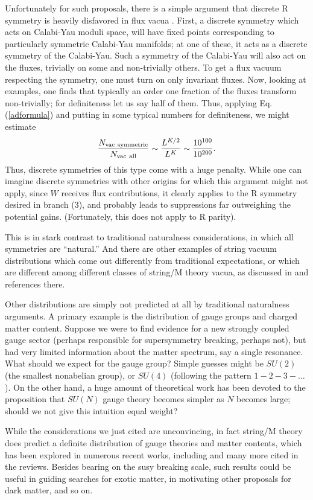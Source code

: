 \documentclass[aps,amsfonts]{ar2e}
\begin{document}
Unfortunately for such proposals, there
is a simple argument that discrete R symmetry
is heavily disfavored in flux vacua
\cite{Dine:2005gz}.
First, a discrete symmetry which acts on Calabi-Yau moduli space,
will have fixed points corresponding to particularly symmetric
Calabi-Yau manifolds; at one of these, it acts as a discrete
symmetry of the Calabi-Yau.  Such a symmetry of the Calabi-Yau will
also act on the fluxes, trivially on some and non-trivially others.
To get a flux vacuum respecting the symmetry, one must turn on only
invariant fluxes.  Now, looking at examples, one finds that
typically an order one fraction of the fluxes transform
non-trivially; for definiteness let us say half of them. Thus,
applying Eq. (\ref{adformula}) and putting in some typical numbers for
definiteness, we might estimate
$$
\frac{N_{\rm vac~symmetric}}{N_{\rm vac~all}} \sim
 \frac{L^{K/2}}{L^{K}} \sim \frac{10^{100}}{10^{200}} .
$$
Thus, discrete symmetries of this type come with a huge penalty.
While one can imagine discrete symmetries with other origins for
which this argument might not apply, since $W$ receives flux
contributions, it clearly applies to the R symmetry desired in
branch (3), and probably leads to suppressions far outweighing the
potential gains.  (Fortunately, this does not apply to R parity).

This is in stark contrast to traditional naturalness considerations,
in which all symmetries are ``natural.''  And there are other
examples of string vacuum distributions which come out differently
from traditional expectations, or which are different among different
classes of string/M theory vacua, as discussed in
\cite{Douglas:2006es,Kumar:2006tn} and references there.

Other distributions are simply not predicted at all by traditional
naturalness arguments.  A primary example is the distribution of gauge
groups and charged matter content.  Suppose we were to
find evidence for a new strongly coupled gauge sector (perhaps
responsible for supersymmetry breaking, perhaps not), but had very
limited information about the matter spectrum, say a single resonance.
What should we expect for the gauge group?  Simple guesses might
be $SU(2)$ (the smallest nonabelian group), or $SU(4)$ (following
the pattern $1-2-3-\ldots$).  On the other hand, a huge amount of
theoretical work has been devoted to the proposition that $SU(N)$
gauge theory becomes simpler as $N$ becomes large; should we not give
this intuition equal weight?

While the considerations we just cited are unconvincing,
in fact string/M theory does predict a definite distribution of
gauge theories and matter contents, which has been explored in
numerous recent works, including
\cite{Blumenhagen:2004xx,Dijkstra:2004cc,Gmeiner:2005nh,Douglas:2006xy,Kumar:2005hf,Dienes:2006ut}
and many more cited in the reviews.  Besides bearing on the
susy breaking scale, such results could be useful in guiding searches
for exotic matter, in motivating other proposals for dark matter, and so on.
\end{document}

